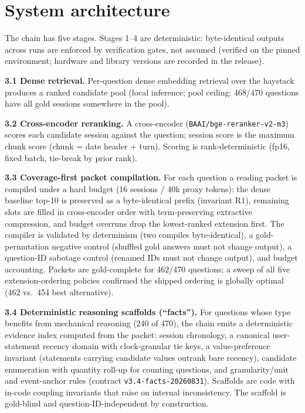 \documentclass[11pt]{article}
\begin{document}
\section{System architecture}
The chain has five stages. Stages 1--4 are deterministic: byte-identical
outputs across runs are enforced by verification gates, not assumed (verified
on the pinned environment; hardware and library versions are recorded in the
release).

\textbf{3.1 Dense retrieval.} Per-question dense embedding retrieval over the
haystack produces a ranked candidate pool (local inference; pool ceiling:
468/470 questions have all gold sessions somewhere in the pool).

\textbf{3.2 Cross-encoder reranking.} A cross-encoder
(\texttt{BAAI/bge-reranker-v2-m3}) scores each candidate session against the
question; session score is the maximum chunk score (chunk = date header +
turn). Scoring is rank-deterministic (fp16, fixed batch, tie-break by prior
rank).

\textbf{3.3 Coverage-first packet compilation.} For each question a reading
packet is compiled under a hard budget (16 sessions / 40k proxy tokens): the
dense baseline top-10 is preserved as a byte-identical prefix (invariant R1),
remaining slots are filled in cross-encoder order with term-preserving
extractive compression, and budget overruns drop the lowest-ranked extension
first. The compiler is validated by determinism (two compiles
byte-identical), a gold-permutation negative control (shuffled gold answers
must not change output), a question-ID sabotage control (renamed IDs must
not change output), and budget accounting. Packets are gold-complete for 462/470 questions; a sweep of
all five extension-ordering policies confirmed the shipped ordering is globally
optimal (462 vs.\ 454 best alternative).

\textbf{3.4 Deterministic reasoning scaffolds (``facts'').} For questions
whose type benefits from mechanical reasoning (240 of 470), the chain emits
a deterministic evidence index computed from the packet: session chronology,
a canonical user-statement recency domain with clock-granular tie keys, a
value-preference invariant (statements carrying candidate values outrank
bare recency), candidate enumeration
with quantity roll-up for counting questions, and granularity/unit and
event-anchor rules (contract \texttt{v3.4-facts-20260831}). Scaffolds are code
with in-code coupling invariants that raise on internal inconsistency. The
scaffold is gold-blind and question-ID-independent by construction.
\end{document}
